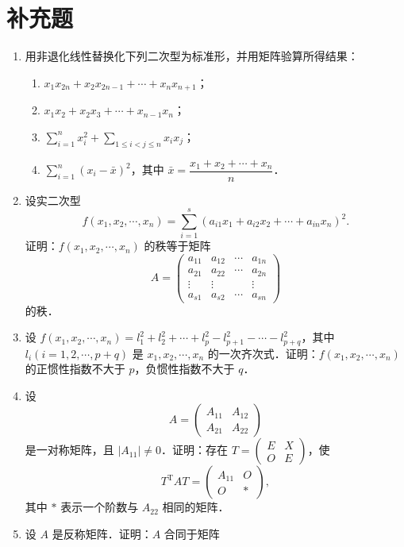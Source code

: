 \section{补充题}
\begin{enumerate}
  \item 用非退化线性替换化下列二次型为标准形，并用矩阵验算所得结果：
  \begin{enumerate}
    \item $x_1x_{2n}+x_2x_{2n-1}+\cdots+x_nx_{n+1}$；
  \anssub
    \item $x_1x_2+x_2x_3+\cdots+x_{n-1}x_n$；
  \anssub
    \item $\sum\limits_{i=1}^{n}x_i^2+\sum\limits_{1\leqslant i<j\leqslant n}x_ix_j$；
  \anssub
    \item $\sum\limits_{i=1}^{n}(x_i-\bar{x})^2$，其中 $\bar{x}=\dfrac{x_1+x_2+\cdots+x_n}{n}$．
  \anssub
  \end{enumerate}
  \item 设实二次型
  \[
    f(x_1,x_2,\cdots,x_n)=\sum_{i=1}^{s}(a_{i1}x_1+a_{i2}x_2+\cdots+a_{in}x_n)^2.
  \]
  证明：$f(x_1,x_2,\cdots,x_n)$ 的秩等于矩阵
  \[
    A=\begin{pmatrix}
      a_{11}&a_{12}&\cdots&a_{1n}\\
      a_{21}&a_{22}&\cdots&a_{2n}\\
      \vdots&\vdots&&\vdots\\
      a_{s1}&a_{s2}&\cdots&a_{sn}
    \end{pmatrix}
  \]
  的秩．
  \ansproof
  \item 设 $f(x_1,x_2,\cdots,x_n)=l_1^2+l_2^2+\cdots+l_p^2-l_{p+1}^2-\cdots-l_{p+q}^2$，其中 $l_i(i=1,2,\cdots,p+q)$ 是 $x_1,x_2,\cdots,x_n$ 的一次齐次式．证明：$f(x_1,x_2,\cdots,x_n)$ 的正惯性指数不大于 $p$，负惯性指数不大于 $q$．
  \ansproof
  \item 设
  \[
    A=\begin{pmatrix}A_{11}&A_{12}\\A_{21}&A_{22}\end{pmatrix}
  \]
  是一对称矩阵，且 $|A_{11}|\neq0$．证明：存在 $T=\begin{pmatrix}E&X\\O&E\end{pmatrix}$，使
  \[
    T^{\mathrm{T}}AT=\begin{pmatrix}A_{11}&O\\O&*\end{pmatrix},
  \]
  其中 $*$ 表示一个阶数与 $A_{22}$ 相同的矩阵．
  \ansproof
  \item 设 $A$ 是反称矩阵．证明：$A$ 合同于矩阵

\end{enumerate}
